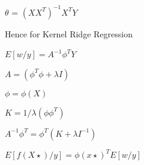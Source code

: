 \documentclass[12pt]{article}
\begin{document}
\begin{center}
\(\theta\)   = $(XX^{T})^{-1}X^{T}Y$ 

\end{center}

Hence for Kernel Ridge Regression \\

\begin{center}

$E\left [w/y  \right ] =  A^{-1}\phi ^{T}Y$\ \break
                      
$A = (\phi^{T} \phi + \lambda I )$ \break

$\phi =  \phi \left ( X \right )$ \break

$K = 1/\lambda \left ( \phi \phi ^{T} \right )$ \break

$A^{-1}\phi ^{T} = \phi ^{T}\left ( K + \lambda I^{-1} \right )$ \break

$E\left [ f\left ( X\star  \right )/y \right ] = \phi \left ( x\star  \right )^{T}E\left [ w/y \right ]$

\end{center}
\end{document}
